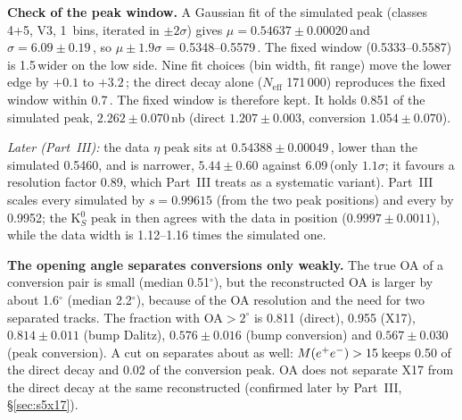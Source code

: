 \textbf{Check of the peak window.} A Gaussian fit of the simulated peak (classes 4+5, V3, 1\,\MeVcc
bins, iterated in $\pm2\sigma$) gives $\mu = 0.54637\pm0.00020$\,\GeVcc and
$\sigma = 6.09\pm0.19$\,\MeVcc, so $\mu\pm1.9\sigma$ = 0.5348--0.5579\,\GeVcc. The fixed window
(0.5333--0.5587) is 1.5\,\MeVcc wider on the low side. Nine fit choices (bin width, fit range)
move the lower edge by $+0.1$ to $+3.2$\,\MeVcc; the direct decay alone ($N_{\mathrm{eff}}$ 171\,000)
reproduces the fixed window within 0.7\,\MeVcc. The fixed window is therefore kept. It holds 0.851
of the simulated peak, $2.262\pm0.070$\,nb (direct $1.207\pm0.003$, conversion $1.054\pm0.070$).

\emph{Later (Part~III):} the data $\eta$ peak sits at $0.54388\pm0.00049$\,\GeVcc, lower than the simulated 0.5460, and
is narrower, $5.44\pm0.60$ against 6.09\,\MeVcc (only $1.1\sigma$; it favours a resolution factor 0.89, which Part~III
treats as a systematic variant). Part~III scales every simulated \Mfour by $s=0.99615$ (from the two peak positions) and
every \Mpipi by 0.9952; the K$^0_S$ peak in \Mpipi then agrees with the data in position ($0.9997\pm0.0011$), while the
data width is 1.12--1.16 times the simulated one.

\textbf{The opening angle separates conversions only weakly.} The true OA of a conversion pair is
small (median 0.51$^\circ$), but the reconstructed OA is larger by about 1.6$^\circ$ (median
2.2$^\circ$), because of the OA resolution and the need for two separated tracks. The fraction with
OA$>2^\circ$ is 0.811 (direct), 0.955 (X17), $0.814\pm0.011$ (bump Dalitz), $0.576\pm0.016$ (bump
conversion) and $0.567\pm0.030$ (peak conversion). A cut on \Mee separates about as well:
$M(e^{+}e^{-})>15$\,\MeVcc keeps 0.50 of the direct decay and 0.02 of the conversion peak.
OA does not separate X17 from the direct decay at the same reconstructed \Mee (confirmed later by Part~III,
\S\ref{sec:s5x17}).

